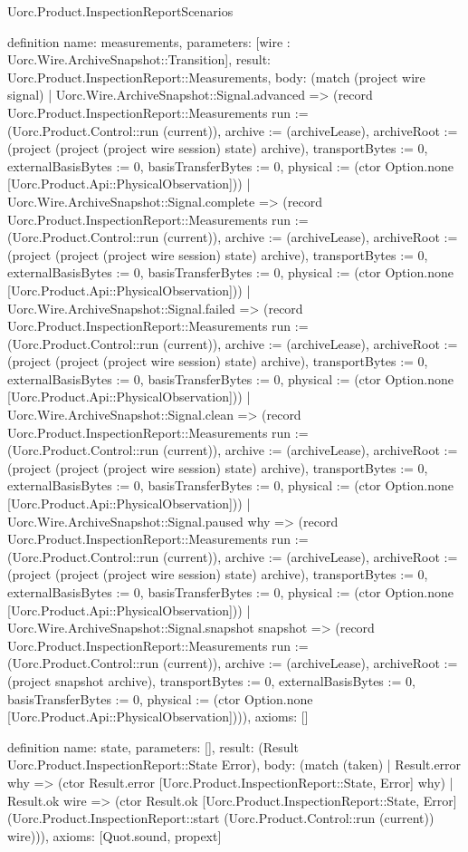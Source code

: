 \begin{lexlean}{Uorc.Product.InspectionReportScenarios}
\begin{semanticmodule}
definition{
  name: measurements,
  parameters: [wire : Uorc.Wire.ArchiveSnapshot::Transition],
  result: Uorc.Product.InspectionReport::Measurements,
  body: (match (project wire signal)
    | Uorc.Wire.ArchiveSnapshot::Signal.advanced => (record Uorc.Product.InspectionReport::Measurements {run := (Uorc.Product.Control::run (current)), archive := (archiveLease), archiveRoot := (project (project (project wire session) state) archive), transportBytes := 0, externalBasisBytes := 0, basisTransferBytes := 0, physical := (ctor Option.none [Uorc.Product.Api::PhysicalObservation])})
    | Uorc.Wire.ArchiveSnapshot::Signal.complete => (record Uorc.Product.InspectionReport::Measurements {run := (Uorc.Product.Control::run (current)), archive := (archiveLease), archiveRoot := (project (project (project wire session) state) archive), transportBytes := 0, externalBasisBytes := 0, basisTransferBytes := 0, physical := (ctor Option.none [Uorc.Product.Api::PhysicalObservation])})
    | Uorc.Wire.ArchiveSnapshot::Signal.failed => (record Uorc.Product.InspectionReport::Measurements {run := (Uorc.Product.Control::run (current)), archive := (archiveLease), archiveRoot := (project (project (project wire session) state) archive), transportBytes := 0, externalBasisBytes := 0, basisTransferBytes := 0, physical := (ctor Option.none [Uorc.Product.Api::PhysicalObservation])})
    | Uorc.Wire.ArchiveSnapshot::Signal.clean => (record Uorc.Product.InspectionReport::Measurements {run := (Uorc.Product.Control::run (current)), archive := (archiveLease), archiveRoot := (project (project (project wire session) state) archive), transportBytes := 0, externalBasisBytes := 0, basisTransferBytes := 0, physical := (ctor Option.none [Uorc.Product.Api::PhysicalObservation])})
    | Uorc.Wire.ArchiveSnapshot::Signal.paused why => (record Uorc.Product.InspectionReport::Measurements {run := (Uorc.Product.Control::run (current)), archive := (archiveLease), archiveRoot := (project (project (project wire session) state) archive), transportBytes := 0, externalBasisBytes := 0, basisTransferBytes := 0, physical := (ctor Option.none [Uorc.Product.Api::PhysicalObservation])})
    | Uorc.Wire.ArchiveSnapshot::Signal.snapshot snapshot => (record Uorc.Product.InspectionReport::Measurements {run := (Uorc.Product.Control::run (current)), archive := (archiveLease), archiveRoot := (project snapshot archive), transportBytes := 0, externalBasisBytes := 0, basisTransferBytes := 0, physical := (ctor Option.none [Uorc.Product.Api::PhysicalObservation])})),
  axioms: []
}

definition{
  name: state,
  parameters: [],
  result: (Result Uorc.Product.InspectionReport::State Error),
  body: (match (taken)
    | Result.error why => (ctor Result.error [Uorc.Product.InspectionReport::State, Error] why)
    | Result.ok wire => (ctor Result.ok [Uorc.Product.InspectionReport::State, Error] (Uorc.Product.InspectionReport::start (Uorc.Product.Control::run (current)) wire))),
  axioms: [Quot.sound, propext]
}


\end{semanticmodule}
\end{lexlean}
